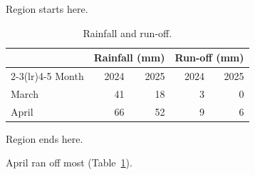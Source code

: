 \documentclass[11pt]{article}
\begin{document}
Region starts here.

\begin{table}[ht]
\centering
\caption{Rainfall and run-off.}\label{tab:rain}
\begin{tabular}{lrrrr}
\toprule
 & \multicolumn{2}{c}{Rainfall (mm)} & \multicolumn{2}{c}{Run-off (mm)} \\
\cmidrule(lr){2-3}\cmidrule(lr){4-5}
Month & 2024 & 2025 & 2024 & 2025 \\
\midrule
March & 41 & 18 & 3 & 0 \\
April & 66 & 52 & 9 & 6 \\
\bottomrule
\end{tabular}
\end{table}

Region ends here.

April ran off most (Table~\ref{tab:rain}).
\end{document}
